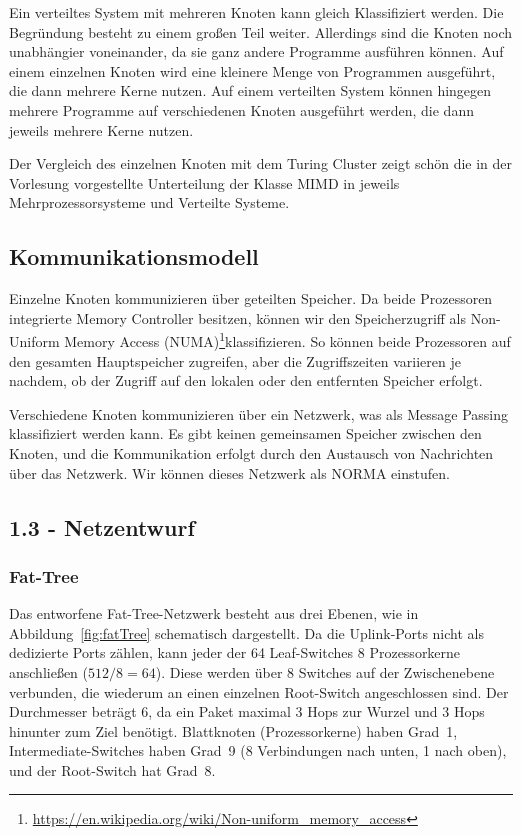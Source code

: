 Ein verteiltes System mit mehreren Knoten kann gleich Klassifiziert werden. Die Begründung besteht zu einem großen Teil weiter. Allerdings sind die Knoten noch unabhängier voneinander, da sie ganz andere Programme ausführen können. Auf einem einzelnen Knoten wird eine kleinere Menge von Programmen ausgeführt, die dann mehrere Kerne nutzen. Auf einem verteilten System können hingegen mehrere Programme auf verschiedenen Knoten ausgeführt werden, die dann jeweils mehrere Kerne nutzen.

Der Vergleich des einzelnen Knoten mit dem Turing Cluster zeigt schön die in der Vorlesung vorgestellte Unterteilung der Klasse MIMD in jeweils Mehrprozessorsysteme und Verteilte Systeme.

\subsection*{Kommunikationsmodell}

Einzelne Knoten kommunizieren über geteilten Speicher. Da beide Prozessoren integrierte Memory Controller besitzen, können wir den Speicherzugriff als Non-Uniform Memory Access (NUMA)\footnote{\url{https://en.wikipedia.org/wiki/Non-uniform_memory_access}}klassifizieren. So können beide Prozessoren auf den gesamten Hauptspeicher zugreifen, aber die Zugriffszeiten variieren je nachdem, ob der Zugriff auf den lokalen oder den entfernten Speicher erfolgt.

    Verschiedene Knoten kommunizieren über ein Netzwerk, was als Message Passing klassifiziert werden kann. Es gibt keinen gemeinsamen Speicher zwischen den Knoten, und die Kommunikation erfolgt durch den Austausch von Nachrichten über das Netzwerk. Wir können dieses Netzwerk als NORMA einstufen.

\subsection*{1.3 - Netzentwurf}

\subsubsection*{Fat-Tree}

Das entworfene Fat-Tree-Netzwerk besteht aus drei Ebenen, wie in Abbildung~\ref{fig:fatTree} schematisch dargestellt. Da die Uplink-Ports nicht als dedizierte Ports zählen, kann jeder der 64 Leaf-Switches 8 Prozessorkerne anschließen ($512 / 8 = 64$). Diese werden über 8 Switches auf der Zwischenebene verbunden, die wiederum an einen einzelnen Root-Switch angeschlossen sind. Der Durchmesser beträgt 6, da ein Paket maximal 3 Hops zur Wurzel und 3 Hops hinunter zum Ziel benötigt. Blattknoten (Prozessorkerne) haben Grad~1, Intermediate-Switches haben Grad~9 (8 Verbindungen nach unten, 1 nach oben), und der Root-Switch hat Grad~8.

